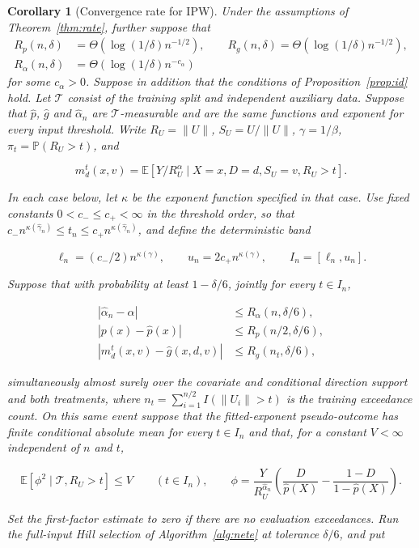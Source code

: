 \documentclass[12pt]{article}
\theoremstyle{plain}
\newtheorem{corollary}[theorem]{Corollary}
\theoremstyle{definition}
\begin{document}
\begin{corollary}[Convergence rate for IPW]
  \label{cor:rate_ipw} Under the assumptions of Theorem~\ref{thm:rate}, further suppose that
\begin{align*}
R_p(n,\delta)&=\Theta(\log(1/\delta)n^{-1/2}),\qquad R_g(n,\delta)=\Theta(\log(1/\delta)n^{-1/2}),\\
R_\alpha(n,\delta)&=\Theta(\log(1/\delta)n^{-c_\alpha})
\end{align*}
for some $c_\alpha>0$. Suppose in addition that the conditions of Proposition~\ref{prop:id} hold. Let $\mathcal T$ consist of the training split and independent auxiliary data. Suppose that $\hat p$, $\hat g$ and $\hat\alpha_n$ are $\mathcal T$-measurable and are the same functions and exponent for every input threshold. Write $R_U=\|U\|$, $S_U=U/\|U\|$, $\gamma=1/\beta$, $\pi_t=\mathbb P(R_U>t)$, and

\[
m_d^t(x,v)=\mathbb E[Y/R_U^\alpha\mid X=x,D=d,S_U=v,R_U>t].
\]

In each case below, let $\kappa$ be the exponent function specified in that case. Use fixed constants $0<c_-\leq c_+<\infty$ in the threshold order, so that $c_-n^{\kappa(\hat\gamma_n)}\leq t_n\leq c_+n^{\kappa(\hat\gamma_n)}$, and define the deterministic band

\[
\ell_n=(c_-/2)n^{\kappa(\gamma)},\qquad u_n=2c_+n^{\kappa(\gamma)},\qquad I_n=[\ell_n,u_n].
\]

Suppose that with probability at least $1-\delta/6$, jointly for every $t\in I_n$,

\[
\begin{aligned}
|\hat\alpha_n-\alpha|&\leq R_\alpha(n,\delta/6),\\
|p(x)-\hat p(x)|&\leq R_p(n/2,\delta/6),\\
|m_d^t(x,v)-\hat g(x,d,v)|&\leq R_g(n_t,\delta/6),
\end{aligned}
\]

simultaneously almost surely over the covariate and conditional direction support and both treatments, where $n_t=\sum_{i=1}^{n/2}I(\|U_i\|>t)$ is the training exceedance count. On this same event suppose that the fitted-exponent pseudo-outcome has finite conditional absolute mean for every $t\in I_n$ and that, for a constant $V<\infty$ independent of $n$ and $t$,

\[
\mathbb E[\phi^2\mid\mathcal T,R_U>t]\leq V\qquad(t\in I_n),\qquad \phi=\frac{Y}{R_U^{\hat\alpha_n}}\left(\frac{D}{\hat p(X)}-\frac{1-D}{1-\hat p(X)}\right).
\]

Set the first-factor estimate to zero if there are no evaluation exceedances. Run the full-input Hill selection of Algorithm~\ref{alg:nete} at tolerance $\delta/6$, and put


\end{corollary}
\end{document}
